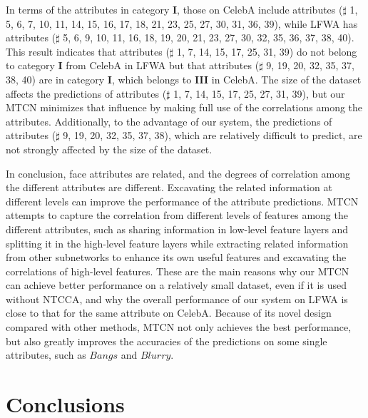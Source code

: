 \documentclass{sig-alternate-05-2015}
\begin{document}
In terms of the attributes in category \textbf{I}, those on CelebA include attributes ($\sharp$ 1, 5, 6, 7, 10, 11, 14, 15, 16, 17, 18, 21, 23, 25, 27, 30, 31, 36, 39), while LFWA has attributes ($\sharp$ 5, 6, 9, 10, 11, 16, 18, 19, 20, 21, 23, 27, 30, 32, 35, 36, 37, 38, 40). This result indicates that attributes ($\sharp$ 1, 7, 14, 15, 17, 25, 31, 39) do not belong to category \textbf{I} from CelebA in LFWA but that attributes ($\sharp$ 9, 19, 20, 32, 35, 37, 38, 40) are in category \textbf{I}, which belongs to \textbf{III} in CelebA. The size of the dataset affects the predictions of attributes ($\sharp$ 1, 7, 14, 15, 17, 25, 27, 31, 39), but our MTCN minimizes that influence by making full use of the correlations among the attributes. Additionally, to the advantage of our system, the predictions of attributes ($\sharp$ 9, 19, 20, 32, 35, 37, 38), which are relatively difficult to predict, are not strongly affected by the size of the dataset.



In conclusion, face attributes are related, and the degrees of correlation among the different attributes are different. Excavating the related information at different levels can improve the performance of the attribute predictions. MTCN attempts to capture the correlation from different levels of features among the different attributes, such as sharing information in low-level feature layers and splitting it in the high-level feature layers while extracting related information from other subnetworks to enhance its own useful features and excavating the correlations of high-level features. These are the main reasons why our MTCN can achieve better performance on a relatively small dataset, even if it is used without NTCCA, and why the overall performance of our system on LFWA is close to that for the same attribute on CelebA. Because of its novel design compared with other methods, MTCN not only achieves the best performance, but also greatly improves the accuracies of the predictions on some single attributes, such as $Bangs$ and $Blurry$.








\section{Conclusions}
\end{document}
